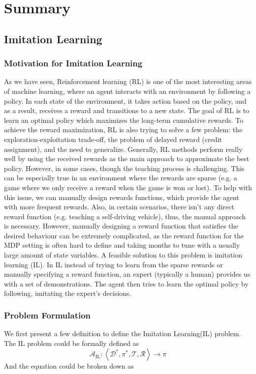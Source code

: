 \documentclass[11pt]{article}
\begin{document}
\section{Summary}
\subsection{Imitation Learning}
\subsubsection{Motivation for Imitation Learning}
As we have seen, Reinforcement learning (RL) is one of the most interesting areas of machine learning, where an agent interacts with an environment by following a policy. In each state of the environment, it takes action based on the policy, and as a result, receives a reward and transitions to a new state. The goal of RL is to learn an optimal policy which maximizes the long-term cumulative rewards. To achieve the reward maximization, RL is also trying to solve a few problem: the exploration-exploitation trade-off, the problem of delayed reward (credit assignment), and the need to generalize.
Generally, RL methods perform really well by using the received rewards as the main approach to approximate the best policy. However, in some cases, though the teaching process is challenging. This can be especially true in an environment where the rewards are sparse (e.g. a game where we only receive a reward when the game is won or lost). To help with this issue, we can manually design rewards functions, which provide the agent with more frequent rewards. Also, in certain scenarios, there isn’t any direct reward function (e.g. teaching a self-driving vehicle), thus, the manual approach is necessary. However, manually designing a reward function that satisfies the desired behaviour can be extremely complicated, as the reward function for the MDP setting is often hard to define and taking months to tune with a usually large amount of state variables.
A feasible solution to this problem is imitation learning (IL). In IL instead of trying to learn from the sparse rewards or manually specifying a reward function, an expert (typically a human) provides us with a set of demonstrations. The agent then tries to learn the optimal policy by following, imitating the expert’s decisions.

\subsubsection{Problem Formulation}
\normalfont
We first present a few definition to define the Imitation Learning(IL) problem. The IL problem could be formally defined as 
$$
\mathcal{A}_{\mathrm{IL}}:\left\langle\mathcal{D}^{*}, \pi^{*}, \mathcal{T}, \mathcal{R}\right\rangle \rightarrow \pi
$$
And the equation could be broken down as 
\end{document}
